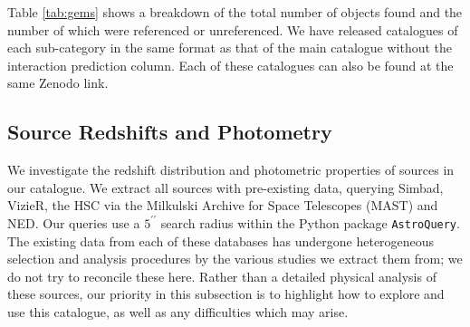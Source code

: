 {Table \ref{tab:gems} shows a breakdown of the total number of objects found and the number of which were referenced or unreferenced. We have released catalogues of each sub-category in the same format as that of the main catalogue without the interaction prediction column. Each of these catalogues can also be found at the same Zenodo link.


\begin{table}
\centering
\caption{A breakdown of gems found in the visual inspection stage of contamination. Each gem category has been classified based on the references associated with each object.} 
\label{tab:gems}
\end{table}


\vspace{-5mm}

\subsection{Source Redshifts and Photometry}\label{z_phot_analysis}
\noindent We investigate the redshift distribution and photometric properties of sources in our catalogue. We extract all sources with pre-existing data, querying Simbad, VizieR, the HSC via the Milkulski Archive for Space Telescopes (MAST) and NED. Our queries use a $5^{\prime \prime}$ search radius within the Python package \texttt{AstroQuery}. The existing data from each of these databases has undergone heterogeneous selection and analysis procedures by the various studies we extract them from; we do not try to reconcile these here. Rather than a detailed physical analysis of these sources, our priority in this subsection is to highlight how to explore and use this catalogue, as well as any difficulties which may arise.

}
